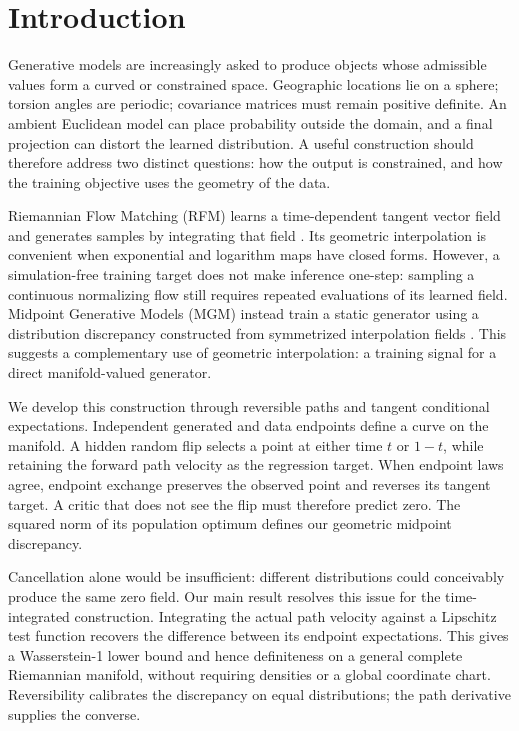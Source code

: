 \section{Introduction}
Generative models are increasingly asked to produce objects whose admissible values form a curved or constrained space. Geographic locations lie on a sphere; torsion angles are periodic; covariance matrices must remain positive definite. An ambient Euclidean model can place probability outside the domain, and a final projection can distort the learned distribution. A useful construction should therefore address two distinct questions: how the output is constrained, and how the training objective uses the geometry of the data.

Riemannian Flow Matching (RFM) learns a time-dependent tangent vector field and generates samples by integrating that field \citep{chen2024general}. Its geometric interpolation is convenient when exponential and logarithm maps have closed forms. However, a simulation-free training target does not make inference one-step: sampling a continuous normalizing flow still requires repeated evaluations of its learned field. Midpoint Generative Models (MGM) instead train a static generator using a distribution discrepancy constructed from symmetrized interpolation fields \citep{shlenskii2026midpoint}. This suggests a complementary use of geometric interpolation: a training signal for a direct manifold-valued generator.

We develop this construction through reversible paths and tangent conditional expectations. Independent generated and data endpoints define a curve on the manifold. A hidden random flip selects a point at either time $t$ or $1-t$, while retaining the forward path velocity as the regression target. When endpoint laws agree, endpoint exchange preserves the observed point and reverses its tangent target. A critic that does not see the flip must therefore predict zero. The squared norm of its population optimum defines our geometric midpoint discrepancy.

Cancellation alone would be insufficient: different distributions could conceivably produce the same zero field. Our main result resolves this issue for the time-integrated construction. Integrating the actual path velocity against a Lipschitz test function recovers the difference between its endpoint expectations. This gives a Wasserstein-1 lower bound and hence definiteness on a general complete Riemannian manifold, without requiring densities or a global coordinate chart. Reversibility calibrates the discrepancy on equal distributions; the path derivative supplies the converse.

